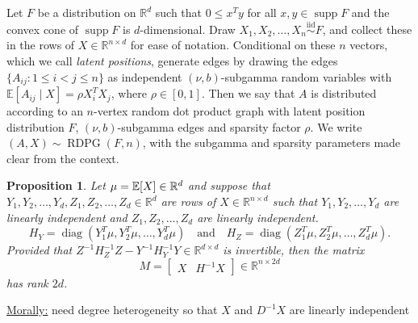 \documentclass[aspectratio=169]{beamer}
\newcommand{\RDPG}{\operatorname{RDPG}}
\newcommand{\R}{\mathbb{R}}
\newcommand{\bbE}{\mathbb{E}}
\newcommand{\E}[2][]{%
	\ifthenelse{ \equal{#1}{} }
	{\ensuremath{\mathbb{E} \brac*{#2}}}
	{\ensuremath{\mathbb{E} \brac*{#2 \, \middle \vert \, #1}}}
}
\DeclarePairedDelimiter{\brac}{[}{]}
\newcommand \diid {\stackrel{\mathrm{iid}}{\sim}}
\DeclareMathOperator*{\diag}{diag}
\DeclareMathOperator*{\supp}{supp}
\newtheorem{proposition}{Proposition}
\theoremstyle{remark}
\begin{document}
\begin{frame}

    \begin{definition}
        Let $F$ be a distribution on $\R^d$ such that $0 \le x^T y$ for all $x,y \in \supp F$ and the convex cone of $\supp F$ is $d$-dimensional.
        Draw $X_1,X_2,\dots,X_n \diid F$, and collect these in the rows of $X \in \R^{n \times d}$ for ease of notation.
        Conditional on these $n$ vectors, which we call {\em latent positions}, generate edges by drawing the edges $\{ A_{ij} : 1 \le i < j \le n \}$ as independent $(\nu,b)$-subgamma random variables with $\bbE[ A_{ij} \mid X ] = \rho X_i^T X_j$, where $\rho \in [0,1]$.
        Then we say that $A$ is distributed according to an $n$-vertex random dot product graph with latent position distribution $F$, $(\nu,b)$-subgamma edges and sparsity factor $\rho$.
        We write $(A,X) \sim \RDPG( F, n)$, with the subgamma and sparsity parameters made clear from the context.
    \end{definition}
\end{frame}

\begin{frame}
    \begin{proposition}
        \label{prop:XHX-rank}
        Let $\mu = \E{X} \in \R^d$ and suppose that $Y_1,Y_2,\dots,Y_d,Z_1,Z_2,\dots,Z_d \in \R^d$ are rows of $X \in \R^{n \times d}$ such that $Y_1,Y_2,\dots,Y_d$ are linearly independent and $Z_1,Z_2,\dots,Z_d$ are linearly independent.
        \begin{equation*}
            H_Y = \diag\left( Y_1^T \mu, Y_2^T \mu, \dots, Y_d^T \mu \right)
            ~~~\text{ and }~~~
            H_Z = \diag\left( Z_1^T \mu, Z_2^T \mu, \dots, Z_d^T \mu \right).
        \end{equation*}
        Provided that $Z^{-1} H_Z^{-1} Z - Y^{-1} H_Y^{-1} Y \in \R^{d \times d}$ is invertible, then the matrix
        \begin{equation*} \label{eq:targetmx}
            M = \begin{bmatrix} X & H^{-1} X \end{bmatrix} \in \R^{n \times 2d}
        \end{equation*}
        has rank $2d$.
    \end{proposition}
    
    \underline{Morally:} need degree heterogeneity so that $X$ and $D^{-1} X$ are linearly independent
\end{frame}
\end{document}
